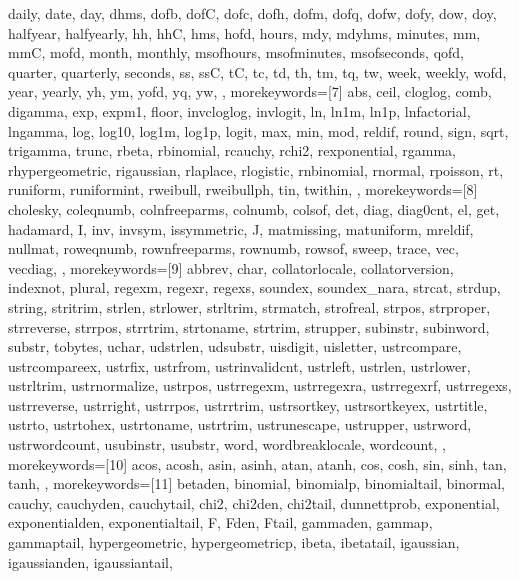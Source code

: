 {{        daily, date, day, dhms, dofb, dofC, dofc, dofh, dofm, dofq, dofw, 
        dofy, dow, doy, halfyear, halfyearly, hh, hhC, hms, hofd, hours, 
        mdy, mdyhms, minutes, mm, mmC, mofd, month, monthly, msofhours, 
        msofminutes, msofseconds, qofd, quarter, quarterly, seconds, ss, 
        ssC, tC, tc, td, th, tm, tq, tw, week, weekly, wofd, year, yearly, 
        yh, ym, yofd, yq, yw,
    },
    morekeywords=[7]{
        abs, ceil, cloglog, comb, digamma, exp, expm1, floor, invcloglog, 
        invlogit, ln, ln1m, ln1p, lnfactorial, lngamma, log, log10, log1m, 
        log1p, logit, max, min, mod, reldif, round, sign, sqrt, trigamma, 
        trunc, rbeta, rbinomial, rcauchy, rchi2, rexponential, rgamma, 
        rhypergeometric, rigaussian, rlaplace, rlogistic, rnbinomial, 
        rnormal, rpoisson, rt, runiform, runiformint, rweibull, rweibullph, 
        tin, twithin,
    },
    morekeywords=[8]{
        cholesky, coleqnumb, colnfreeparms, colnumb, colsof, det, diag, 
        diag0cnt, el, get, hadamard, I, inv, invsym, issymmetric, J, 
        matmissing, matuniform, mreldif, nullmat, roweqnumb, rownfreeparms, 
        rownumb, rowsof, sweep, trace, vec, vecdiag,
    },
    morekeywords=[9]{
        abbrev, char, collatorlocale, collatorversion, indexnot, plural, 
        regexm, regexr, regexs, soundex, soundex_nara, strcat, strdup, 
        string, stritrim, strlen, strlower, strltrim, strmatch, strofreal, 
        strpos, strproper, strreverse, strrpos, strrtrim, strtoname, strtrim, 
        strupper, subinstr, subinword, substr, tobytes, uchar, udstrlen, 
        udsubstr, uisdigit, uisletter, ustrcompare, ustrcompareex, ustrfix, 
        ustrfrom, ustrinvalidcnt, ustrleft, ustrlen, ustrlower, ustrltrim, 
        ustrnormalize, ustrpos, ustrregexm, ustrregexra, ustrregexrf, 
        ustrregexs, ustrreverse, ustrright, ustrrpos, ustrrtrim, 
        ustrsortkey, ustrsortkeyex, ustrtitle, ustrto, ustrtohex, 
        ustrtoname, ustrtrim, ustrunescape, ustrupper, ustrword, 
        ustrwordcount, usubinstr, usubstr, word, wordbreaklocale, wordcount,
    },
    morekeywords=[10]{
        acos, acosh, asin, asinh, atan, atanh, cos, cosh, sin, sinh, tan, 
        tanh,
    },
    morekeywords=[11]{
        betaden, binomial, binomialp, binomialtail, binormal, cauchy, 
        cauchyden, cauchytail, chi2, chi2den, chi2tail, dunnettprob, 
        exponential, exponentialden, exponentialtail, F, Fden, Ftail, 
        gammaden, gammap, gammaptail, hypergeometric, hypergeometricp, 
        ibeta, ibetatail, igaussian, igaussianden, igaussiantail, 
}}
